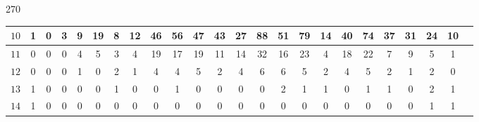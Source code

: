 \documentclass[12pt]{book}
\theoremstyle{definition}
\newcounter{in}
\begin{document}
\begin{table}[t]
\begin{turn}{270}
\begin{tabular}{| c | c | c | c | c | c | c | c | c |  c | c | c | c | c | c | c | c | c | c | c | c | c | c | c | }
$10$ & 1 & 0 & 3 & 9 & 19 & 8 & 12 & 46 & 56 & 47 & 43 & 27 & 88 & 51 & 79 & 14 & 40 & 74 & 37 & 31 & 24 & 10 \\ \hline
$11$ & 0 & 0 & 0 & 4 & 5 & 3 & 4 & 19 & 17 & 19 & 11 & 14 & 32 & 16 & 23 & 4 & 18 & 22 & 7 & 9 & 5 & 1 \\ \hline
$12$ & 0 & 0 & 0 & 1 & 0 & 2 & 1 & 4 & 4 & 5 & 2 & 4 & 6 & 6 & 5 & 2 & 4 & 5 & 2 & 1 & 2 & 0 \\ \hline
$13$ & 1 & 0 & 0 & 0 & 0 & 1 & 0 & 0 & 1 & 0 & 0 & 0 & 0 & 2 & 1 & 1 & 0 & 1 & 1 & 0 & 2 & 1 \\ \hline
$14$ & 1 & 0 & 0 & 0 & 0 & 0 & 0 & 0 & 0 & 0 & 0 & 0 & 0 & 0 & 0 & 0 & 0 & 0 & 0 & 0 & 1 & 1 \\ \hline

\end{tabular}
\end{turn}
\end{table}





























\backmatter




\printindex
\end{document}

